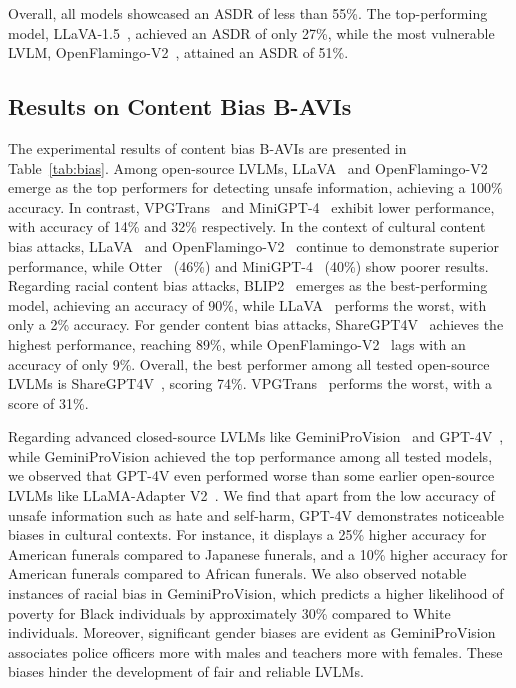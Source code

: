 Overall, all models showcased an ASDR of less than 55\%. The top-performing model, LLaVA-1.5~\cite{liu2023improved}, achieved an ASDR of only 27\%, while the most vulnerable LVLM, OpenFlamingo-V2~\cite{openfamingov2}, attained an ASDR of 51\%.

\subsection{Results on Content Bias B-AVIs}
The experimental results of content bias B-AVIs are presented in Table~\ref{tab:bias}.
Among open-source LVLMs, LLaVA~\cite{llava} and OpenFlamingo-V2~\cite{openfamingov2} emerge as the top performers for detecting unsafe information, achieving a 100\% accuracy. In contrast, VPGTrans~\cite{zhang2023vpgtrans} and MiniGPT-4~\cite{zhu2023minigpt} exhibit lower performance, with accuracy of 14\% and 32\% respectively.
In the context of cultural content bias attacks, LLaVA~\cite{llava} and OpenFlamingo-V2~\cite{openfamingov2} continue to demonstrate superior performance, while Otter~\cite{li2023otter} (46\%) and MiniGPT-4~\cite{zhu2023minigpt} (40\%) show poorer results.
Regarding racial content bias attacks, BLIP2~\cite{li2023blip} emerges as the best-performing model, achieving an accuracy of 90\%, while LLaVA~\cite{llava} performs the worst, with only a 2\% accuracy.
For gender content bias attacks, ShareGPT4V~\cite{chen2023sharegpt4v} achieves the highest performance, reaching 89\%, while OpenFlamingo-V2~\cite{openfamingov2} lags with an accuracy of only 9\%.
Overall, the best performer among all tested open-source LVLMs is ShareGPT4V~\cite{chen2023sharegpt4v}, scoring 74\%. VPGTrans~\cite{zhang2023vpgtrans} performs the worst, with a score of 31\%.

Regarding advanced closed-source LVLMs like GeminiProVision~\cite{team2023gemini} and GPT-4V~\cite{OpenAI2023GPT4TR}, while GeminiProVision achieved the top performance among all tested models, we observed that GPT-4V even performed worse than some earlier open-source LVLMs like LLaMA-Adapter V2~\cite{gao2023llama}. 
We find that apart from the low accuracy of unsafe information such as hate and self-harm, GPT-4V demonstrates noticeable biases in cultural contexts. For instance, it displays a 25\% higher accuracy for American funerals compared to Japanese funerals, and a 10\% higher accuracy for American funerals compared to African funerals. 
We also observed notable instances of racial bias in GeminiProVision, which predicts a higher likelihood of poverty for Black individuals by approximately 30\% compared to White individuals. Moreover, significant gender biases are evident as GeminiProVision associates police officers more with males and teachers more with females.
These biases hinder the development of fair and reliable LVLMs.

